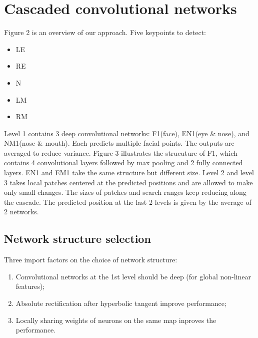 \section{Cascaded convolutional networks}
Figure 2 is an overview of our approach. Five keypoints to detect:
\begin{itemize}
	\item LE
	\item RE
	\item N
	\item LM
	\item RM
\end{itemize}

Level 1 contains 3 deep convolutional networks: F1(face), EN1(eye \& nose), and NM1(nose \& mouth).
Each predicts multiple facial points. The outputs are averaged to reduce variance. Figure 3
illustrates the strucuture of F1, which contains 4 convolutional layers followed by max pooling and
2 fully connected layers. EN1 and EM1 take the same structure but different size. Level 2 and level
3 takes local patches centered at the predicted positions and are allowed to make only small
changes. The sizes of patches and search ranges keep reducing along the cascade. The predicted
position at the last 2 levels is given by the average of 2 networks.

\subsection{Network structure selection}
Three import factors on the choice of network structure:
\begin{enumerate}
	\item Convolutional networks at the 1st level should be deep (for global non-linear features);
	\item Absolute rectification after hyperbolic tangent improve performance;
	\item Locally sharing weights of neurons on the same map inproves the performance.
\end{enumerate}


